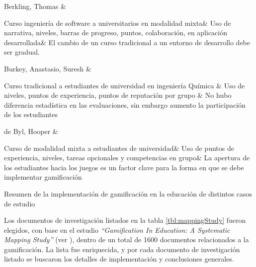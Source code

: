 {        Berkling, Thomas \cite{gamificationFailure} &

            Curso ingeniería de software a universitarios en modalidad mixta&
            Uso de narrativa, niveles, barras de progreso, puntos, colaboración, en aplicación desarrollada&
            El cambio de un curso tradicional a un entorno de desarrollo debe ser gradual.\\\hline


        Burkey, Anastasio, Suresh \cite{gamificationChemical} &

            Curso tradicional a estudiantes de universidad en ingeniería Química &
            Uso de niveles, puntos de experiencia, puntos de reputación por grupo &
            No hubo diferencia estadística en las evaluaciones, sin embargo aumento la participación de los estudiantes\\\hline


        de Byl, Hooper \cite{gamifiedLearningKeyAttributes} &   %

            Curso de modalidad mixta a estudiantes de universidad&
            Uso de puntos de experiencia, niveles, tareas opcionales y competencias en grupo&
            La apertura de los estudiantes hacia los juegos es un factor clave para la forma en que se debe implementar gamificación\\\hline



    }{Resumen de la implementación de gamificación en la educación de distintos casos de estudio}

 \noindent Los documentos de investigación listados en la tabla \ref{tbl:mappingStudy} fueron elegidos, con base en el estudio {\em ``Gamification In Education: A Systematic Mapping Study''} (ver \cite{mappingStudy}), dentro de un total de 1600 documentos relacionados a la gamificación. La lista fue enriquecida, y por cada documento de investigación listado se buscaron los detalles de implementación y conclusiones generales.

